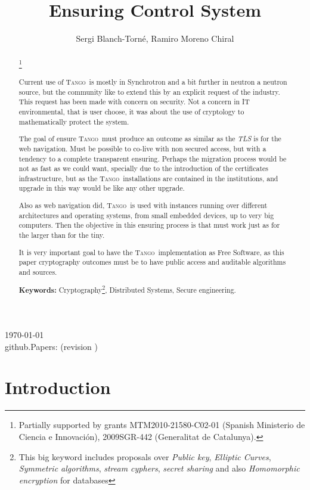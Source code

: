 \documentclass[10pt,a4paper,twoside]{llncs}
\title{Ensuring \tango Control System}
\author{Sergi Blanch-Torn\'e\inst{1}, Ramiro Moreno Chiral\inst{2}}
\institute{
 Escola Polit\`ecnica Superior, Universitat de Lleida. Spain.\\
 \email{\tt sblanch@alumnes.udl.es}
 \and 
 Departament de Matem\`atica. Universitat de Lleida. Spain.\\
 \email{\tt ramiro@matematica.udl.es}
 }
\newcommand{\version}{github.Papers: \gitCommitterDate\;(revision \gitAbbrevHash) }
\newcommand{\tango}{\textsc{Tango}}
\begin{document}
\maketitle
\begin{center}
 \today\\
 \version
\end{center}


\begin{abstract}\footnote{Partially supported by grants MTM2010-21580-C02-01 (Spanish Ministerio de Ciencia e Innovaci\'on), 2009SGR-442 (Generalitat de Catalunya).}

Current use of \tango\, is mostly in Synchrotron and a bit further in neutron a neutron source, but the community like to extend this by an explicit request of the industry. This request has been made with concern on security. Not a concern in IT environmental, that is user choose, it was about the use of cryptology to mathematically protect the system.

The goal of ensure \tango\, must produce an outcome as similar as the \emph{TLS} is for the web navigation. Must be possible to co-live with non secured access, but with a tendency to a complete transparent ensuring. Perhaps the migration process would be not as fast as we could want, specially due to the introduction of the certificates infrastructure, but as the \tango\, installations are contained in the institutions, and upgrade in this way would be like any other upgrade.

Also as web navigation did, \tango\, is used with instances running over different architectures and operating systems, from small embedded devices, up to very big computers. Then the objective in this ensuring process is that must work just as for the larger than for the tiny.

It is very important goal to have the \tango\, implementation as Free Software, as this paper cryptography outcomes must be to have public access and auditable algorithms and sources.
   
{\bf Keywords:} Cryptography\footnote{This big keyword includes proposals over \emph{Public key}, \emph{Elliptic Curves}, \emph{Symmetric algorithms}, \emph{stream cyphers}, \emph{secret sharing} and also \emph{Homomorphic encryption} for databases}, Distributed Systems, Secure engineering.

\end{abstract}

%
\section{Introduction \label{sec:intro}}
\end{document}
